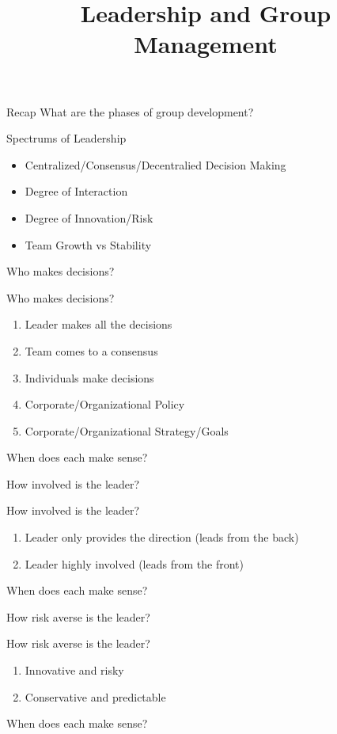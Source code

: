 \documentclass[aspectratio=169]{beamer}
\title{Leadership and Group Management}
\institute{Engineers for Exploration, UC San Diego}
\begin{document}
\maketitle
\begin{frame}{Recap}
    What are the phases of group development?
\end{frame}
\begin{frame}{Spectrums of Leadership}
    \begin{itemize}
        \item Centralized/Consensus/Decentralied Decision Making
        \item Degree of Interaction
        \item Degree of Innovation/Risk
        \item Team Growth vs Stability
    \end{itemize}
\end{frame}
\begin{frame}
    Who makes decisions?
\end{frame}
\begin{frame}{Who makes decisions?}
    \begin{enumerate}
        \item Leader makes all the decisions
        \item Team comes to a consensus
        \item Individuals make decisions
        \item Corporate/Organizational Policy
        \item Corporate/Organizational Strategy/Goals
    \end{enumerate}
    When does each make sense?
\end{frame}
\begin{frame}
    How involved is the leader?
\end{frame}
\begin{frame}{How involved is the leader?}
    \begin{enumerate}
        \item Leader only provides the direction (leads from the back)
        \item Leader highly involved (leads from the front)
    \end{enumerate}
    When does each make sense?
\end{frame}
\begin{frame}
    How risk averse is the leader?
\end{frame}
\begin{frame}{How risk averse is the leader?}
    \begin{enumerate}
        \item Innovative and risky
        \item Conservative and predictable
    \end{enumerate}
    When does each make sense?
\end{frame}
\end{document}
